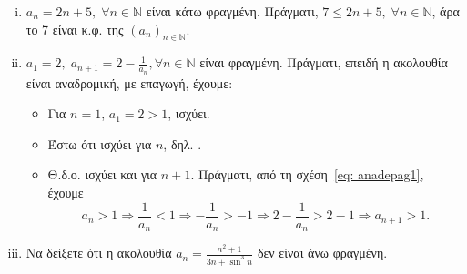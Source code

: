 \documentclass[main.tex]{subfiles}
\begin{document}
\begin{examples}
\begin{enumerate}[i)]
        \item $ a_{n}= 2n+5, \; \forall n \in \mathbb{N} $ είναι κάτω 
            φραγμένη.
            Πράγματι, $ 7 \leq 2n+5, \; \forall n \in \mathbb{N} $, άρα το 
            7 είναι κ.φ. της $ (a_{n} )_{n \in \mathbb{N}} $.

        \item $ a_{1}=2, \; a_{n+1}=2 - \frac{1}{a_{n}}, \forall n \in 
            \mathbb{N}$
            είναι φραγμένη. Πράγματι, επειδή η ακολουθία είναι αναδρομική, 
            με επαγωγή, έχουμε:
            \begin{itemize}
                \item Για $ n=1 $, $ a_{1}=2>1 $, ισχύει. 
                \item Έστω ότι ισχύει για $n$, δηλ. .
                \item Θ.δ.ο. ισχύει και για $ n+1 $. Πράγματι, από τη 
                    σχέση~\eqref{eq: anadepag1}, έχουμε
                    \[
                        a_{n}>1 \Rightarrow \frac{1}{a_{n}} 
                        < 1 \Rightarrow - \frac{1}{a_{n}} > 
                        -1 \Rightarrow 2 - \frac{1}{a_{n}} 
                        > 2-1 \Rightarrow a_{n+1} > 1.
                    \] 
            \end{itemize}

            \item Να δείξετε ότι η ακολουθία $ a_{n} = 
                \frac{n^{2}+1}{3n+ \sin^{3}{n}} $ δεν είναι άνω φραγμένη.


\end{enumerate}
\end{examples}
\end{document}
